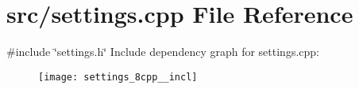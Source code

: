 \section{src/settings.cpp File Reference}
\label{settings_8cpp}
{\ttfamily \#include \char`\"{}settings.\+h\char`\"{}}\newline
Include dependency graph for settings.\+cpp\+:\nopagebreak
\begin{figure}[H]
\begin{center}
\leavevmode
\texttt{[image: settings\_8cpp\_\_incl]}
\end{center}
\end{figure}
